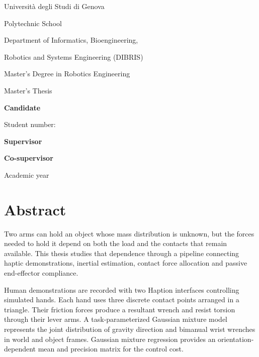 \hypersetup{pageanchor=false}
\begin{titlepage}
\centering
{\Large Universit\`a degli Studi di Genova\par}
\vspace{5mm}
{\large Polytechnic School\par}
\vspace{3mm}
{\normalsize Department of Informatics, Bioengineering,\par
Robotics and Systems Engineering (DIBRIS)\par}
\vspace{12mm}
{\large Master's Degree in Robotics Engineering\par}
\vspace{19mm}
{\LARGE\bfseries\ThesisTitle\par}
\vspace{9mm}
{\large Master's Thesis\par}
\vfill
\begin{minipage}[t]{0.46\textwidth}\raggedright
\textbf{Candidate}\par\ThesisAuthor\par
Student number: \StudentNumber
\end{minipage}\hfill
\begin{minipage}[t]{0.46\textwidth}\raggedright
\textbf{Supervisor}\par\SupervisorName\par\medskip
\textbf{Co-supervisor}\par\CoSupervisorName
\end{minipage}
\vspace{19mm}
\par Academic year \AcademicYear
\end{titlepage}
\hypersetup{pageanchor=true}
\chapter*{Abstract}
Two arms can hold an object whose mass distribution is unknown, but the forces needed to hold it depend on both the load and the contacts that remain available. This thesis studies that dependence through a pipeline connecting haptic demonstrations, inertial estimation, contact force allocation and passive end-effector compliance.

Human demonstrations are recorded with two Haption interfaces controlling simulated hands. Each hand uses three discrete contact points arranged in a triangle. Their friction forces produce a resultant wrench and resist torsion through their lever arms. A task-parameterized Gaussian mixture model represents the joint distribution of gravity direction and bimanual wrist wrenches in world and object frames. Gaussian mixture regression provides an orientation-dependent mean and precision matrix for the control cost.

